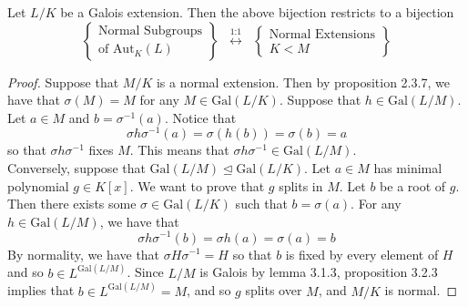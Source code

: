 \documentclass[a4paper]{article}
\begin{document}
\begin{prp}{}{} Let $L/K$ be a Galois extension. Then the above bijection restricts to a bijection $$\left\{\substack{\text{Normal Subgroups}\\\text{of }\text{Aut}_K(L)}\right\}\;\;\overset{\text{1:1}}{\longleftrightarrow}\;\;\left\{\substack{\text{Normal Extensions}\\ K<M}\right\}$$ 
\begin{proof}
Suppose that $M/K$ is a normal extension. Then by proposition 2.3.7, we have that $\sigma(M)=M$ for any $M\in\text{Gal}(L/K)$. Suppose that $h\in\text{Gal}(L/M)$. Let $a\in M$ and $b=\sigma^{-1}(a)$. Notice that $$\sigma h\sigma^{-1}(a)=\sigma(h(b))=\sigma(b)=a$$ so that $\sigma h\sigma^{-1}$ fixes $M$. This means that $\sigma h\sigma^{-1}\in\text{Gal}(L/M)$. \\

Conversely, suppose that $\text{Gal}(L/M)\trianglelefteq\text{Gal}(L/K)$. Let $a\in M$ has minimal polynomial $g\in K[x]$. We want to prove that $g$ splits in $M$. Let $b$ be a root of $g$. Then there exists some $\sigma\in\text{Gal}(L/K)$ such that $b=\sigma(a)$. For any $h\in\text{Gal}(L/M)$, we have that $$\sigma h\sigma^{-1}(b)=\sigma h(a)=\sigma(a)=b$$ By normality, we have that $\sigma H\sigma^{-1}=H$ so that $b$ is fixed by every element of $H$ and so $b\in L^{\text{Gal}(L/M)}$. Since $L/M$ is Galois by lemma 3.1.3, proposition 3.2.3 implies that $b\in L^{\text{Gal}(L/M)}=M$, and so $g$ splits over $M$, and $M/K$ is normal. 
\end{proof}
\end{prp}
\end{document}
